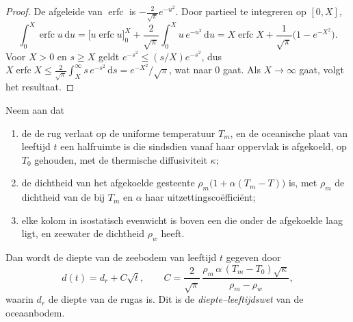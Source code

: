 \begin{proof}
De afgeleide van $\operatorname{erfc}$ is $-\frac{2}{\sqrt\pi}e^{-u^2}$.
Door partieel te integreren op $[0, X]$,
\[
  \int_0^X \operatorname{erfc} u\,\mathrm du
  = \bigl[u \operatorname{erfc} u\bigr]_0^X + \frac{2}{\sqrt\pi}\int_0^X u\,e^{-u^2}\,\mathrm du
  = X\operatorname{erfc} X + \frac{1}{\sqrt\pi}\bigl(1 - e^{-X^2}\bigr).
\]
Voor $X > 0$ en $s \ge X$ geldt $e^{-s^2} \le (s/X)e^{-s^2}$, dus
$X\operatorname{erfc} X \le \frac{2}{\sqrt\pi}\int_X^\infty s\,e^{-s^2}\,\mathrm ds
= e^{-X^2}/\sqrt\pi$, wat naar 0 gaat. Als $X \to \infty$ gaat, volgt het resultaat.
\end{proof}

\begin{theorem}\label{thm:b1:rifts-ridges-margins:depth-age}
Neem aan dat
\begin{enumerate}
  \item de  de rug verlaat op de uniforme temperatuur $T_m$, en de oceanische plaat van leeftijd $t$ een halfruimte is die sindsdien vanaf haar oppervlak is afgekoeld, op $T_0$ gehouden, met de thermische diffusiviteit $\kappa$;
  \item de dichtheid van het afgekoelde gesteente $\rho_m\bigl(1 + \alpha(T_m -
        T)\bigr)$ is, met $\rho_m$ de dichtheid van de  bij $T_m$ en
        $\alpha$ haar uitzettingscoëfficiënt;
  \item elke kolom in isostatisch evenwicht is boven een  die onder de afgekoelde laag ligt, en zeewater de dichtheid $\rho_w$ heeft.
\end{enumerate}
Dan wordt de diepte van de zeebodem van leeftijd $t$ gegeven door
\[
  d(t) = d_r + C\sqrt t, \qquad
  C = \frac{2}{\sqrt\pi}\,\frac{\rho_m\,\alpha\,(T_m - T_0)\sqrt\kappa}{\rho_m - \rho_w},
\]
waarin $d_r$ de diepte van de rugas is. Dit is de \emph{diepte--leeftijdswet} van de oceaanbodem.
\end{theorem}

